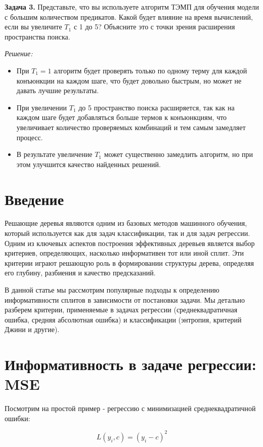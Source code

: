 \textbf{Задача 3.}
\newline
Представьте, что вы используете алгоритм ТЭМП для обучения модели с большим количеством предикатов. Какой будет влияние на время вычислений, если вы увеличите $T_1$ с 1 до 5? Объясните это с точки зрения расширения пространства поиска.

\textit{Решение:}
\begin{itemize}
    \item При $T_1 = 1$ алгоритм будет проверять только по одному терму для каждой конъюнкции на каждом шаге, что будет довольно быстрым, но может не давать лучшие результаты.
    \item При увеличении $T_1$ до 5 пространство поиска расширяется, так как на каждом шаге будет добавляться больше термов к конъюнкциям, что увеличивает количество проверяемых комбинаций и тем самым замедляет процесс.
    \item В результате увеличение $T_1$ может существенно замедлить алгоритм, но при этом улучшится качество найденных решений.
\end{itemize}

\section*{Введение}

Решающие деревья являются одним из базовых методов машинного обучения, который используется как для задач классификации, так и для задач регрессии. Одним из ключевых аспектов построения эффективных деревьев является выбор критериев, определяющих, насколько информативен тот или иной сплит. Эти критерии играют решающую роль в формировании структуры дерева, определяя его глубину, разбиения и качество предсказаний. 

В данной статье мы рассмотрим популярные подходы к определению информативности сплитов в зависимости от постановки задачи. Мы детально разберем критерии, применяемые в задачах регрессии (среднеквадратичная ошибка, средняя абсолютная ошибка) и классификации (энтропия, критерий Джини и другие).


\section*{Информативность в задаче регрессии: MSE}
Посмотрим на простой пример - регрессию с минимизацией среднеквадратичной ошибки:

\[
L\left(y_{i}, c\right)=\left(y_{i}-c\right)^{2}
\]


